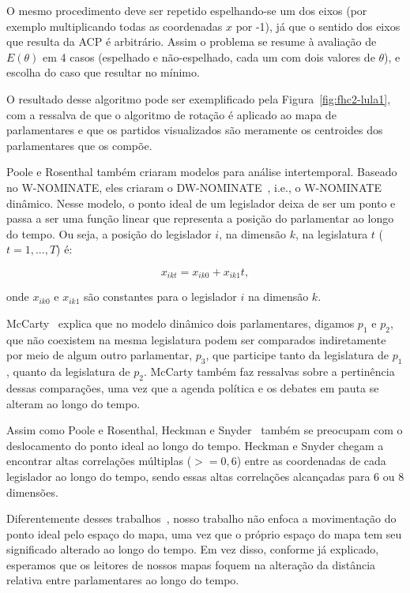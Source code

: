 \documentclass[a4paper, 12pt]{article}
\newcommand\wnominate{W-NOMINATE\xspace}
\begin{document}
O mesmo procedimento deve ser repetido espelhando-se um dos eixos (por exemplo multiplicando todas as coordenadas $x$ por -1), já que o sentido dos eixos que resulta da ACP é arbitrário. Assim o problema se resume à avaliação de $E(\theta)$ em 4 casos (espelhado e não-espelhado, cada um com dois valores de $\theta$), e escolha do caso que resultar no mínimo.

O resultado desse algoritmo pode ser exemplificado pela Figura~\ref{fig:fhc2-lula1}, com a ressalva de que o algoritmo de rotação é aplicado ao mapa de parlamentares e que os partidos visualizados são meramente os centroides dos parlamentares que os compõe.

Poole e Rosenthal também criaram modelos para análise intertemporal. Baseado no \wnominate, eles criaram o DW-NOMINATE~\cite{poole2001dnomiante}, i.e., o \wnominate dinâmico. Nesse modelo, o ponto ideal de um legislador deixa de ser um ponto e passa a ser uma função linear que representa a posição do parlamentar ao longo do tempo. Ou seja, a posição do legislador $i$, na dimensão $k$, na legislatura $t$ ($t=1,...,T$) é:

\begin{equation}
x_{ikt} = x_{ik0} + x_{ik1}t,
\label{eq:dwnominate}
\end{equation}

onde $x_{ik0}$ e $x_{ik1}$ são constantes para o legislador $i$ na dimensão $k$.

McCarty~\cite{mccarty2011measuring} explica que no modelo dinâmico dois parlamentares, digamos $p_1$ e $p_2$, que não coexistem na mesma legislatura podem ser comparados indiretamente por meio de algum outro parlamentar, $p_3$, que participe tanto da legislatura de $p_1$, quanto da legislatura de $p_2$. McCarty também faz ressalvas sobre a pertinência dessas comparações, uma vez que a agenda política e os debates em pauta se alteram ao longo do tempo.

Assim como Poole e Rosenthal, Heckman e Snyder~\cite{heckman-snyder1997} também se preocupam com o deslocamento do ponto ideal ao longo do tempo. Heckman e Snyder chegam a encontrar altas correlações múltiplas ($>= 0,6$) entre as coordenadas de cada legislador ao longo do tempo, sendo essas altas correlações alcançadas para 6 ou 8 dimensões. 

Diferentemente desses trabalhos~\cite{poole2001dnomiante, heckman-snyder1997}, nosso trabalho não enfoca a movimentação do ponto ideal pelo espaço do mapa, uma vez que o próprio espaço do mapa tem seu significado alterado ao longo do tempo. Em vez disso, conforme já explicado, esperamos que os leitores de nossos mapas foquem na alteração da distância relativa entre parlamentares ao longo do tempo.
\end{document}
